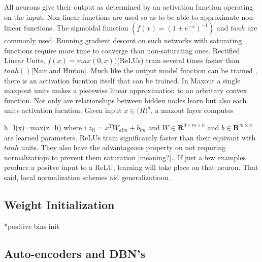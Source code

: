         
        
All neurons give their output as determined by an activation  function operating on the input.
Non-linear functions are used so as to be able to approximate non-linear functions\citep{bengio2009advances}.
The sigmoidal function $(f(x)=(1+e^{-x})^{-1})$ and $tanh$ are commonly used\citep{bengio2009advances}.
Running gradient descent on such networks with saturating functions require more time to converge than non-saturating ones\citep{krizhevsky2012imagenet}.
Rectified Linear Units, $f(x) = max(0,x))$(ReLUs)\citep{lecun2012efficient} train several times faster than  $tanh()$\citep{bengio2009advances}[Nair and Hinton]. 
Much like the output model function can be trained , there is an activation fucntion itself that can be trained.
In Maxout a single maxpout units makes a piecewise  linear approximation to an arbritary convex function.
Not only are relationships between hidden nodes learn but also each units activation fucntion.
Given input $x \in \mathbf(R)^d$, a maxout layer computes

\be
h_l(x)=max(z_{li}) where i\in [1,n]
\ee
$z_{li}=x^T W_{alm} +b_{lm}$ and $W\in \mathbf{R}^{d\times m\times n}$ and $b\in \mathbf{R}^{m\times n}$are learned parameters.\citep{bengio2009advances}
ReLUs train significantly faster than their equivant with $tanh$ units\citep{krizhevsky2012imagenet}.
They also have the advantageous property on not requiring normalizatiojn to prevent them saturation [meaning?]\citep{krizhevsky2012imagenet}..
If just a few examples produce a positve input to a ReLU, learning will take place on that neuron.
That said, local normalization schemes aid generalizatioon.



        \subsection{Weight Initialization}
        
        
        
        *positive bias init
        \subsection{Auto-encoders and DBN's}
        
